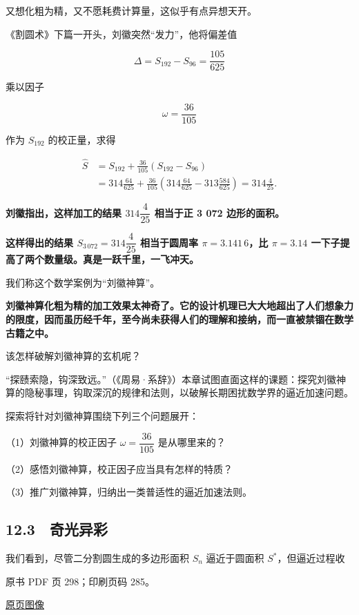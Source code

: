 又想化粗为精，又不愿耗费计算量，这似乎有点异想天开。

《割圆术》下篇一开头，刘徽突然``发力''，他将偏差值

\[
\Delta=S_{192}-S_{96}=\frac{105}{625}
\]

乘以因子

\[
\omega=\frac{36}{105}
\tag{12.2.1}
\]

作为 \(S_{192}\) 的校正量，求得

\[
\begin{aligned}
\widehat S&=S_{192}+\frac{36}{105}(S_{192}-S_{96})\\
&=314\frac{64}{625}+\frac{36}{105}\left(314\frac{64}{625}-313\frac{584}{625}\right)=314\frac{4}{25}.
\end{aligned}
\tag{12.2.2}
\]

\textbf{刘徽指出，这样加工的结果 \(314\dfrac{4}{25}\) 相当于正 3 072 边形的面积。}

\textbf{这样得出的结果 \(S_{3\,072}=314\dfrac{4}{25}\) 相当于圆周率 \(\pi=3.141\,6\)，比 \(\pi=3.14\) 一下子提高了两个数量级。真是一跃千里，一飞冲天。}

我们称这个数学案例为``刘徽神算''。

\textbf{刘徽神算化粗为精的加工效果太神奇了。它的设计机理已大大地超出了人们想象力的限度，因而虽历经千年，至今尚未获得人们的理解和接纳，而一直被禁锢在数学古籍之中。}

该怎样破解刘徽神算的玄机呢？

``探赜索隐，钩深致远。''（《周易·系辞》）本章试图直面这样的课题：探究刘徽神算的隐秘事理，钩取深沉的规律和法则，以破解长期困扰数学界的逼近加速问题。

探索将针对刘徽神算围绕下列三个问题展开：

（1）刘徽神算的校正因子 \(\omega=\dfrac{36}{105}\) 是从哪里来的？

（2）感悟刘徽神算，校正因子应当具有怎样的特质？

（3）推广刘徽神算，归纳出一类普适性的逼近加速法则。

\subsection{12.3　奇光异彩}\label{ch12-ux5947ux5149ux5f02ux5f69}

我们看到，尽管二分割圆生成的多边形面积 \(S_n\) 逼近于圆面积 \(S^*\)，但逼近过程收

\clearpage

原书 PDF 页 298；印刷页码 285。

\href{source-images/pdf-298.jpeg}{原页图像}

